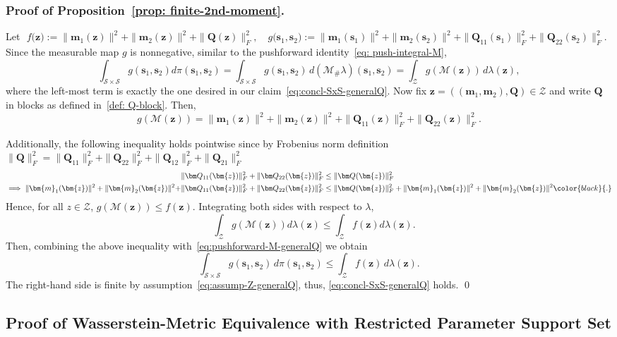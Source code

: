 \documentclass[opre,sglanonrev]{informs4}
\newcommand{\mZ}{\mathcal{Z}}
\newcommand{\mS}{\mathcal{S}}
\newcommand{\mM}{\mathcal{M}}
\newcommand{\bmean}{\bm{m}}
\newcommand{\bs}{\bm{s}}
\newcommand{\bz}{\bm{z}}
\newcommand{\bQ}{\bm Q}
\newcommand{\srevision}[1]{{\color{black}{#1}}}
\begin{document}
{\begin{APPENDICES}
\subsubsection{Proof of Proposition~\ref{prop: finite-2nd-moment}.}
Let $\,\, f\bigl(\bz):=\|\bmean_1(\bz)\|^2+\|\bmean_2(\bz)\|^2+\|\bQ(\bz)\|_F^2,
\quad
g\bigl(\bs_1, \bs_2\bigr):=\|\bmean_1(\bs_1)\|^2+\|\bmean_2(\bs_2)\|^2+\|\bQ_{11}(\bs_1)\|_F^2+\|\bQ_{22}(\bs_2)\|_F^2.$
 Since the measurable map $g$ is nonnegative, similar to the pushforward identity~\eqref{eq: push-integral-M},
\begin{equation}\label{eq:pushforward-M-generalQ}
\int_{\mS\times \mS} g(\bs_1, \bs_2) d \pi(\bs_1, \bs_2) = \int_{\mS\times \mS} g(\bs_1, \bs_2)\,d(\mM_\#\lambda)(\bs_1, \bs_2)
=
\int_{\mZ} g(\mM(\bz))\,d\lambda(\bz),
\end{equation}
where the left-most term is exactly the one desired in our claim~\eqref{eq:concl-SxS-generalQ}. Now fix $\bz=((\bmean_1,\bmean_2),\bQ)\in\mZ$ and write $\bQ$ in blocks as defined in~\eqref{def: Q-block}. Then,
\[
g(\mM(\bz))=\|\bmean_1(\bz)\|^2+\|\bmean_2(\bz)\|^2+\|\bQ_{11}(\bz)\|_F^2+\|\bQ_{22}(\bz)\|_F^2.
\]

Additionally, the following inequality holds pointwise since by Frobenius norm definition $\|\bQ\|_F^2=\|\bQ_{11}\|_F^2+\|\bQ_{22}\|_F^2+\|\bQ_{12}\|_F^2+\|\bQ_{21}\|_F^2$\srevision{,}
\begin{align*}
& \|\bQ_{11}(\bz)\|_F^2+\|\bQ_{22}(\bz)\|_F^2 \le \|\bQ(\bz)\|_F^2 \\ 
\implies  \|\bmean_1(\bz)\|^2+\|\bmean_2(\bz)\|^2 + &  \|\bQ_{11}(\bz)\|_F^2+\|\bQ_{22}(\bz)\|_F^2 \le  \|\bQ(\bz)\|_F^2 +\|\bmean_1(\bz)\|^2+\|\bmean_2(\bz)\|^2\srevision{.}
\end{align*}
Hence, for all $z \in \mZ$,  $g(\mM(\bz))\le f(\bz)$. Integrating both sides with respect to $\lambda$,
\[ \quad \int_\mZ g(\mM(\bz)) d \lambda(\bz) \leq \int_\mZ f(\bz) d\lambda(\bz).\]
Then, combining the above inequality with~\eqref{eq:pushforward-M-generalQ} we obtain
\[
\int_{\mS\times \mS} g(\bs_1, \bs_2)\,d\pi(\bs_1, \bs_2)
\le
\int_{\mZ} f(\bz)\,d\lambda(\bz).
\]
The right-hand side is finite by assumption~\eqref{eq:assump-Z-generalQ}, thus, \eqref{eq:concl-SxS-generalQ} holds. \hfill \qed

\subsection{Proof of Wasserstein-Metric Equivalence with Restricted Parameter Support Set}\label{appndx: restricted}


\end{APPENDICES}}
\end{document}
